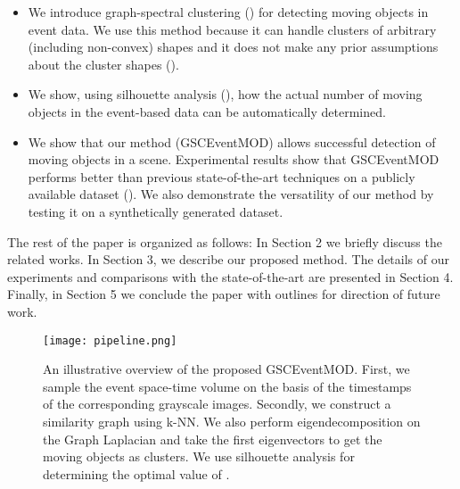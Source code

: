 \documentclass{article}
\begin{document}
\begin{itemize}[leftmargin=*]
    \itemsep0em
    \item We introduce graph-spectral clustering (\cite{martin2018robust,luo2003spectral,von2007tutorial,ng2001spectral,panda2017nystrom}) for detecting moving objects in event data. We use this method because it can handle clusters of arbitrary (including non-convex) shapes and it does not make any prior assumptions about the cluster shapes (\cite{meila2016spectral}).
    \item We show, using silhouette analysis (\cite{shutaywi2021silhouette}), how the actual number of moving objects in the event-based data can be automatically determined.
    \item We show that our method (GSCEventMOD) allows successful detection of moving objects in a scene. Experimental results show that GSCEventMOD performs better than previous state-of-the-art techniques on a publicly available dataset (\cite{almatrafi2020distance}). We also demonstrate the versatility of our method by testing it on a synthetically generated dataset.
\end{itemize}
The rest of the paper is organized as follows:
In Section 2 we briefly discuss the related works. In Section 3, we describe our proposed method. The details of our experiments and comparisons with the state-of-the-art are presented in Section 4. Finally, in Section 5 we conclude the paper with outlines for direction of future work.

\begin{figure*}
\begin{center}
\texttt{[image: pipeline.png]}
\end{center}
   \caption{An illustrative overview of the proposed GSCEventMOD. First, we sample the event space-time volume on the basis of the timestamps of the corresponding grayscale images. Secondly, we construct a similarity graph using k-NN. We also perform eigendecomposition on the Graph Laplacian and take the first  eigenvectors to get the moving objects as clusters. We use silhouette analysis for determining the optimal value of .}
    \label{fig:pipeline}
\label{fig:short}
\end{figure*}
\end{document}
